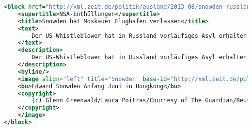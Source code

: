 \begin{lstlisting}[language= XML,caption=XML Beispiel]
<block href="http://xml.zeit.de/politik/ausland/2013-08/snowden-russland-asyl" year="2013" issue="32" ressort="Politik" contenttype="article" publication-date="" expires="" date-last-modified="2013-08-01T12:34:02+00:00" date-first-released="2013-08-01T12:14:01.153941+00:00" date-last-published="2013-08-01T12:35:02.244084+00:00" last-semantic-change="2013-08-01T12:16:34.101705+00:00">
	<supertitle>NSA-Enthüllungen</supertitle>
	<title>Snowden hat Moskauer Flughafen verlassen</title>
	<text>
		Der US-Whistleblower hat in Russland vorläufiges Asyl erhalten. Snowden soll bereits aus dem Transitbereich des Moskauer Flughafens nach Russland eingereist sein.
	</text>
	<description>
		Der US-Whistleblower hat in Russland vorläufiges Asyl erhalten. Snowden soll bereits aus dem Transitbereich des Moskauer Flughafens nach Russland eingereist sein.
	</description>
	<byline/>
	<image align="left" title="Snowden" base-id="http://xml.zeit.de/politik/ausland/2013-08/snowden/" type="jpg" publication-date="" expires="">
	<bu>Edward Snowden Anfang Juni in Hongkong</bu>
	<copyright>
		(c) Glenn Greenwald/Laura Poitras/Courtesy of The Guardian/Reuters
	</copyright>
	</image>
</block>
\end{lstlisting}